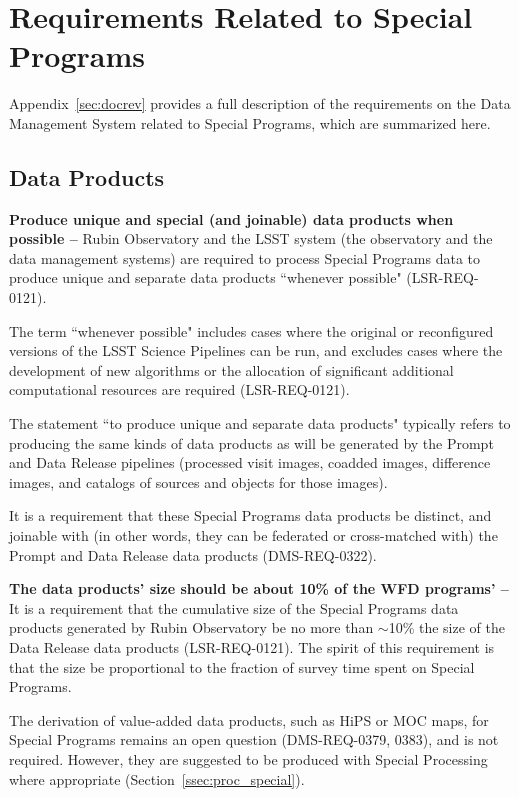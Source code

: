 \section{Requirements Related to Special Programs}\label{sec:req}

Appendix~\ref{sec:docrev} provides a full description of the requirements 
on the Data Management System related to Special Programs, which are summarized here.

\subsection{Data Products}\label{ssec:req_dp}

\textbf{Produce unique and special (and joinable) data products when possible --}
Rubin Observatory and the LSST system (the observatory and the data 
management systems) are required to process Special Programs data to 
produce unique and separate data products ``whenever possible" 
(LSR-REQ-0121).

The term ``whenever possible" includes cases where the original or 
reconfigured versions of the LSST Science Pipelines can be run, and 
excludes cases where the development of new algorithms or the allocation 
of significant additional computational resources are required 
(LSR-REQ-0121).

The statement ``to produce unique and separate data products" typically 
refers to producing the same kinds of data products as will be generated 
by the Prompt and Data Release pipelines (processed visit images, coadded 
images, difference images, and catalogs of sources and objects for those 
images).

It is a requirement that these Special Programs data products be distinct, 
and joinable with (in other words, they can be federated or cross-matched 
with) the Prompt and Data Release data products (DMS-REQ-0322).

\textbf{The data products' size should be about 10\% of the WFD programs' --}
It is a requirement that the cumulative size of the Special Programs data 
products generated by Rubin Observatory be no more than $\sim$10\% the 
size of the Data Release data products (LSR-REQ-0121).
The spirit of this requirement is that the size be proportional to the fraction 
of survey time spent on Special Programs.

The derivation of value-added data products, such as HiPS or MOC maps, for 
Special Programs remains an open question (DMS-REQ-0379, 0383), and is not required.
However, they are suggested to be produced with Special Processing where
appropriate (Section~\ref{ssec:proc_special}).


